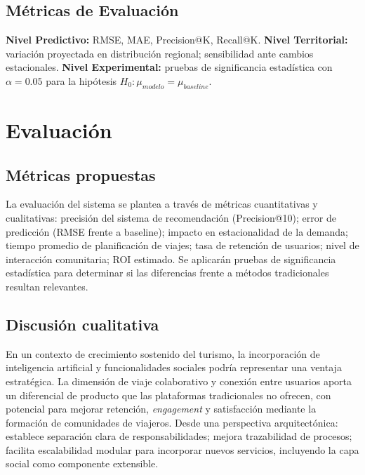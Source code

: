 \documentclass[12pt, letterpaper]{article}
\begin{document}
\subsection{Métricas de Evaluación}

\textbf{Nivel Predictivo:} RMSE, MAE, Precision@K, Recall@K. \textbf{Nivel Territorial:} variación proyectada en distribución regional; sensibilidad ante cambios estacionales. \textbf{Nivel Experimental:} pruebas de significancia estadística con $\alpha = 0.05$ para la hipótesis $H_0: \mu_{modelo} = \mu_{baseline}$.

\section{Evaluación}

\subsection{Métricas propuestas}

La evaluación del sistema se plantea a través de métricas cuantitativas y cualitativas: precisión del sistema de recomendación (Precision@10); error de predicción (RMSE frente a baseline); impacto en estacionalidad de la demanda; tiempo promedio de planificación de viajes; tasa de retención de usuarios; nivel de interacción comunitaria; ROI estimado. Se aplicarán pruebas de significancia estadística para determinar si las diferencias frente a métodos tradicionales resultan relevantes.

\subsection{Discusión cualitativa}

En un contexto de crecimiento sostenido del turismo, la incorporación de inteligencia artificial y funcionalidades sociales podría representar una ventaja estratégica. La dimensión de viaje colaborativo y conexión entre usuarios aporta un diferencial de producto que las plataformas tradicionales no ofrecen, con potencial para mejorar retención, \textit{engagement} y satisfacción mediante la formación de comunidades de viajeros. Desde una perspectiva arquitectónica: establece separación clara de responsabilidades; mejora trazabilidad de procesos; facilita escalabilidad modular para incorporar nuevos servicios, incluyendo la capa social como componente extensible.
\end{document}

